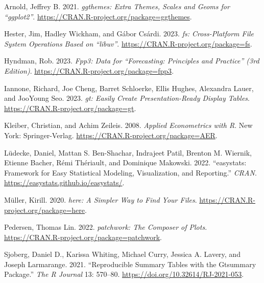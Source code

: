 \documentclass[
  letterpaper,
  paper =a4,
  twoside,
  openright,
  headsepline,
  footsepline,
  listof = totocnumbered,
  chapterprefix = true,
  firstiscover]{scrbook}
\newlength{\cslhangindent}
\newlength{\cslentryspacingunit} %
\newenvironment{CSLReferences}[2] %
 {%
  \setlength{\parindent}{0pt}
  \ifodd #1
  \let\oldpar\par
  \def\par{\hangindent=\cslhangindent\oldpar}
  \fi
  \setlength{\parskip}{#2\cslentryspacingunit}
 }%
 {}
\begin{document}

\hypertarget{refs}{}
\begin{CSLReferences}{1}{0}
\leavevmode{}%
Arnold, Jeffrey B. 2021. \emph{{ggthemes}: Extra Themes, Scales and
Geoms for {``{ggplot2}''}}.
\url{https://CRAN.R-project.org/package=ggthemes}.

\leavevmode{}%
Hester, Jim, Hadley Wickham, and Gábor Csárdi. 2023. \emph{{fs}:
Cross-Platform File System Operations Based on {``{libuv}''}}.
\url{https://CRAN.R-project.org/package=fs}.

\leavevmode{}%
Hyndman, Rob. 2023. \emph{Fpp3: Data for {``{Forecasting: Principles and
Practice}''} (3rd Edition)}.
\url{https://CRAN.R-project.org/package=fpp3}.

\leavevmode{}%
Iannone, Richard, Joe Cheng, Barret Schloerke, Ellis Hughes, Alexandra
Lauer, and JooYoung Seo. 2023. \emph{{gt}: Easily Create
Presentation-Ready Display Tables}.
\url{https://CRAN.R-project.org/package=gt}.

\leavevmode{}%
Kleiber, Christian, and Achim Zeileis. 2008. \emph{Applied Econometrics
with {R}}. New York: Springer-Verlag.
\url{https://CRAN.R-project.org/package=AER}.

\leavevmode{}%
Lüdecke, Daniel, Mattan S. Ben-Shachar, Indrajeet Patil, Brenton M.
Wiernik, Etienne Bacher, Rémi Thériault, and Dominique Makowski. 2022.
{``{easystats}: Framework for Easy Statistical Modeling, Visualization,
and Reporting.''} \emph{CRAN}.
\url{https://easystats.github.io/easystats/}.

\leavevmode{}%
Müller, Kirill. 2020. \emph{{here}: A Simpler Way to Find Your Files}.
\url{https://CRAN.R-project.org/package=here}.

\leavevmode{}%
Pedersen, Thomas Lin. 2022. \emph{{patchwork}: The Composer of Plots}.
\url{https://CRAN.R-project.org/package=patchwork}.

\leavevmode{}%
Sjoberg, Daniel D., Karissa Whiting, Michael Curry, Jessica A. Lavery,
and Joseph Larmarange. 2021. {``Reproducible Summary Tables with the
Gtsummary Package.''} \emph{{The R Journal}} 13: 570--80.
\url{https://doi.org/10.32614/RJ-2021-053}.


\end{CSLReferences}
\end{document}
